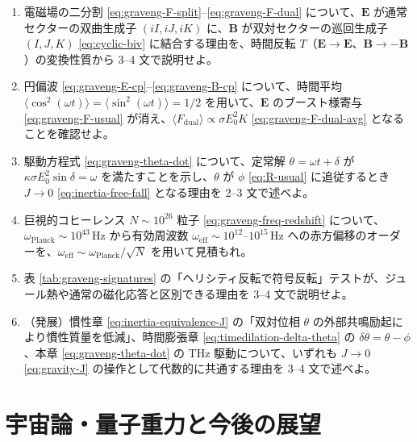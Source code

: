 \documentclass[dvipdfmx,a4paper,oneside]{jsbook}
\numberwithin{equation}{chapter}
\begin{document}
\begin{enumerate}[leftmargin=2em]
  \item 電磁場の二分割 \eqref{eq:graveng-F-split}–\eqref{eq:graveng-F-dual} について、\(\mathbf{E}\) が通常セクターの双曲生成子 \((iI, iJ, iK)\) に、\(\mathbf{B}\) が双対セクターの巡回生成子 \((I, J, K)\) \eqref{eq:cyclic-biv} に結合する理由を、時間反転 \(T\)（\(\mathbf{E} \to \mathbf{E}\)、\(\mathbf{B} \to -\mathbf{B}\)）の変換性質から 3--4 文で説明せよ。

  \item 円偏波 \eqref{eq:graveng-E-cp}–\eqref{eq:graveng-B-cp} について、時間平均 \(\langle\cos^2(\omega t)\rangle = \langle\sin^2(\omega t)\rangle = 1/2\) を用いて、\(\mathbf{E}\) のブースト様寄与 \eqref{eq:graveng-F-usual} が消え、\(\langle F_{\mathrm{dual}}\rangle \propto \sigma E_0^2 K\) \eqref{eq:graveng-F-dual-avg} となることを確認せよ。

  \item 駆動方程式 \eqref{eq:graveng-theta-dot} について、定常解 \(\theta = \omega t + \delta\) が \(\kappa \sigma E_0^2 \sin\delta = \omega\) を満たすことを示し、\(\theta\) が \(\phi\) \eqref{eq:R-usual} に追従するとき \(J \to 0\) \eqref{eq:inertia-free-fall} となる理由を 2--3 文で述べよ。

  \item 巨視的コヒーレンス \(N \sim 10^{26}\) 粒子 \eqref{eq:graveng-freq-redshift} について、\(\omega_{\mathrm{Planck}} \sim 10^{43}\,\mathrm{Hz}\) から有効周波数 \(\omega_{\mathrm{eff}} \sim 10^{12}\)–\(10^{15}\,\mathrm{Hz}\) への赤方偏移のオーダーを、\(\omega_{\mathrm{eff}} \sim \omega_{\mathrm{Planck}}/\sqrt{N}\) を用いて見積もれ。

  \item 表 \ref{tab:graveng-signatures} の「ヘリシティ反転で符号反転」テストが、ジュール熱や通常の磁化応答と区別できる理由を 3--4 文で説明せよ。

  \item （発展）慣性章 \eqref{eq:inertia-equivalence-J} の「双対位相 \(\theta\) の外部共鳴励起により慣性質量を低減」、時間膨張章 \eqref{eq:timedilation-delta-theta} の \(\delta\theta = \theta - \phi\)、本章 \eqref{eq:graveng-theta-dot} の THz 駆動について、いずれも \(J \to 0\) \eqref{eq:gravity-J} の操作として代数的に共通する理由を 3--4 文で述べよ。
\end{enumerate}

\chapter{宇宙論・量子重力と今後の展望}
\end{document}
